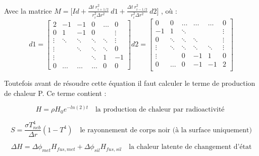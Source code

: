 \documentclass[10pt,a4paper]{article}
\numberwithin{equation}{section}
\begin{document}
Avec la matrice 
$
M = \Big [ Id + \frac{\Delta t ~ r^2_{i+1/2}}{r^2_i \Delta r^2} ~ d1 + \frac{\Delta t ~ r^2_{i-1/2}}{r^2_i \Delta r^2} ~ d2  \Big]
$
, où :
\begin{equation}
d1=
\begin{bmatrix}
    2      & -1     & -1        & 0     &\dots      & 0 \\
    0      &  1     & -1        & 0     &           & \vdots  \\
    \vdots & \ddots & \ddots    &\ddots & \ddots    & \vdots \\
    \vdots &        & \ddots    &\ddots & \ddots    & 0 \\
    \vdots &        &           &\ddots & 1         &  -1 \\
    0      & \dots  & \dots     &\dots  & 0         &  0
\end{bmatrix}
d2=
\begin{bmatrix}
     0     & 0      & \dots  & \dots    &\dots      & 0 \\
    -1     & 1      & \ddots &          &           & \vdots  \\
    0      & \ddots & \ddots & \ddots   &           & \vdots \\
    \vdots & \ddots & \ddots & \ddots   & \ddots    & \vdots \\
    \vdots &        & 0      &  -1      &  1        & 0\\
    0      & \dots  & 0      &  -1      & -1        & 2 \\
\end{bmatrix}
\end{equation}

Toutefois avant de résoudre cette équation il faut calculer le terme de production de chaleur P. Ce terme contient :

\begin{equation}
 H = \rho H_0 e^{-ln(2) t} \quad \textrm{la production de chaleur par radioactivité }
\end{equation}

\begin{equation}
 S =\frac{\sigma T_{neb}^4}{\Delta r}( 1 - T^4)  \quad \textrm{le rayonnement de corps noir (à la surface uniquement)}
\end{equation}

\begin{equation}
 \Delta H =  \Delta \phi_{met} H_{fus,met} + \Delta \phi_{sil}  H_{fus,sil} \quad \textrm{la chaleur latente de changement d'état}
\end{equation}
\end{document}
